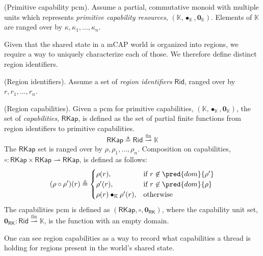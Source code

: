 \begin{param}
	(Primitive capability pcm).
	Assume a partial, commutative monoid with multiple units which represents \emph{primitive capability resources}, $(\mathbb{K}, \bullet_\mathbb{K}, \mathbf{0}_\mathbb{K})$. Elements of $\mathbb{K}$ are ranged over by $\kappa, \kappa_1, \ldots, \kappa_n$.
\end{param}

Given that the shared state in a mCAP world is organized into regions, we require a way to uniquely characterize each of those. We therefore define distinct region identifiers.
\begin{defn}
	(Region identifiers).
	Assume a set of \emph{region identifiers} $\mathsf{Rid}$, ranged over by $r, r_1, \ldots, r_n$.
\end{defn}

\begin{defn}
	(Region capabilities).
	Given a pcm for primitive capabilities, $(\mathbb{K}, \bullet_\mathbb{K}, \mathbf{0}_\mathbb{K})$, the set of \emph{capabilities}, $\mathsf{RKap}$, is defined as the set of partial finite functions from region identifiers to primitive capabilities.
	\[
		\mathsf{RKap} \triangleq \mathsf{Rid} \overset{\text{fin}}{\rightharpoonup} \mathbb{K}
	\]
	The $\mathsf{RKap}$ set is ranged over by $\rho, \rho_1, \ldots, \rho_n$. Composition on capabilities, $\circ : \mathsf{RKap} \times \mathsf{RKap} \rightharpoonup \mathsf{RKap}$, is defined as follows:
	\[
		(\rho \circ \rho') (r)
			\triangleq
		\begin{cases}
			\rho(r), & \text{if } r \not\in \pred{dom}{\rho'}
			\\
			\rho'(r), & \text{if } r \not\in \pred{dom}{\rho}
			\\
			\rho(r) \bullet_\mathbb{K} \rho'(r), & \text{otherwise}
		\end{cases}
	\]
	The capabilities pcm is defined as $(\mathsf{RKap}, \circ, \mathbf{0}_{\mathsf{RK}})$, where the capability unit set, $\mathbf{0}_{\mathsf{RK}} : \mathsf{Rid} \overset{\text{fin}}{\rightharpoonup} \mathbb{K}$, is the function with an empty domain. 
\end{defn}
One can see region capabilities as a way to record what capabilities a thread is holding for regions present in the world's shared state.

